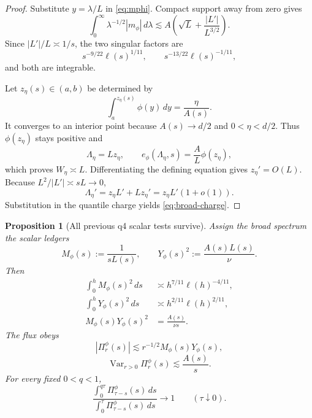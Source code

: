 \documentclass[11pt]{article}
\newtheorem{proposition}[theorem]{Proposition}
\theoremstyle{remark}
\newcommand{\Var}{\operatorname{Var}}
\begin{document}
\begin{proof}
Substitute \(y=\lambda/L\) in \eqref{eq:mphi}.  Compact support away
from zero gives
\[
 \int_0^\infty\lambda^{-1/2}|m_\phi|\,d\lambda
 \lesssim
 A\left(\sqrt L+\frac{|L'|}{L^{3/2}}\right).
\]
Since \(|L'|/L\asymp1/s\), the two singular factors are
\[
 s^{-9/22}\ell(s)^{1/11},
 \qquad
 s^{-13/22}\ell(s)^{-1/11},
\]
and both are integrable.

Let \(z_\eta(s)\in(a,b)\) be determined by
\[
 \int_a^{z_\eta(s)}\phi(y)\,dy=\frac{\eta}{A(s)}.
\]
It converges to an interior point because \(A(s)\to d/2\) and
\(0<\eta<d/2\).  Thus \(\phi(z_\eta)\) stays positive and
\[
 \Lambda_\eta=Lz_\eta,
 \qquad
 e_\phi(\Lambda_\eta,s)=\frac A L\phi(z_\eta),
\]
which proves \(W_\eta\asymp L\).  Differentiating the defining equation
gives \(z_\eta'=O(L)\).  Because \(L^2/|L'|\asymp sL\to0\),
\[
 \Lambda_\eta'=z_\eta L'+Lz_\eta'
 =z_\eta L'(1+o(1)).
\]
Substitution in the quantile charge yields
\eqref{eq:broad-charge}.
\end{proof}

\begin{proposition}[All previous q4 scalar tests survive]
\label{prop:q4}
Assign the broad spectrum the scalar ledgers
\begin{equation}
\label{eq:ledger-def}
 M_\phi(s):=\frac1{sL(s)},
 \qquad
 Y_\phi(s)^2:=\frac{A(s)L(s)}{\nu}.
\end{equation}
Then
\begin{align}
 \int_0^hM_\phi(s)^2\,ds
 &\asymp h^{7/11}\ell(h)^{-4/11},\label{eq:Mtail}\\
 \int_0^hY_\phi(s)^2\,ds
 &\asymp h^{2/11}\ell(h)^{2/11},\label{eq:Ytail}\\
 M_\phi(s)Y_\phi(s)^2
 &=\frac{A(s)}{\nu s}.\label{eq:MY2}
\end{align}
The flux obeys
\begin{equation}
\label{eq:pointwise}
 |\Pi^\phi_r(s)|
 \lesssim r^{-1/2}M_\phi(s)Y_\phi(s),
\end{equation}
\begin{equation}
\label{eq:variation}
 \Var_{r>0}\Pi^\phi_r(s)\lesssim\frac{A(s)}s.
\end{equation}
For every fixed \(0<q<1\),
\begin{equation}
\label{eq:early}
 \frac{\displaystyle
 \int_0^{q\tau}\Pi^\phi_{\tau-s}(s)\,ds}
 {\displaystyle
 \int_0^\tau\Pi^\phi_{\tau-s}(s)\,ds}
 \longrightarrow1
 \qquad(\tau\downarrow0).
\end{equation}
\end{proposition}
\end{document}
